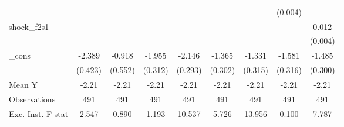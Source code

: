 {\begin{tabular}{l*{8}{c}}
            &                     &                     &                     &                     &                     &                     &     (0.004)         &                     \\
\addlinespace
shock\_f2s1  &                     &                     &                     &                     &                     &                     &                     &       0.012\sym{***}\\
            &                     &                     &                     &                     &                     &                     &                     &     (0.004)         \\
\addlinespace
\_cons      &      -2.389\sym{***}&      -0.918         &      -1.955\sym{***}&      -2.146\sym{***}&      -1.365\sym{***}&      -1.331\sym{***}&      -1.581\sym{***}&      -1.485\sym{***}\\
            &     (0.423)         &     (0.552)         &     (0.312)         &     (0.293)         &     (0.302)         &     (0.315)         &     (0.316)         &     (0.300)         \\
\midrule
Mean Y      &       -2.21         &       -2.21         &       -2.21         &       -2.21         &       -2.21         &       -2.21         &       -2.21         &       -2.21         \\
Observations&         491         &         491         &         491         &         491         &         491         &         491         &         491         &         491         \\
Exc. Inst. F-stat&       2.547         &       0.890         &       1.193         &      10.537         &       5.726         &      13.956         &       0.100         &       7.787         \\
\bottomrule
\end{tabular}
}
